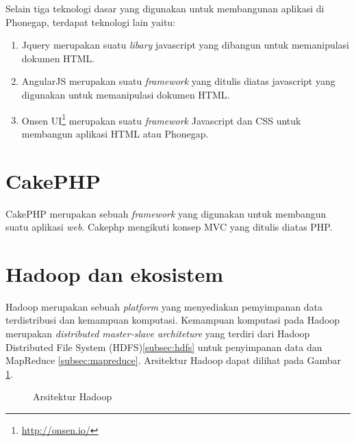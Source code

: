 Selain tiga teknologi dasar yang digunakan untuk membangunan aplikasi di Phonegap, terdapat teknologi lain yaitu:
\begin{enumerate}
	\item Jquery merupakan suatu \textit{libary} javascript yang dibangun untuk memanipulasi dokumen HTML.
	\item AngularJS merupakan suatu \textit{framework} yang ditulis diatas javascript yang digunakan untuk memanipulasi dokumen HTML.
	\item Onsen UI\footnote{\url{http://onsen.io/}} merupakan suatu \textit{framework} Javascript  dan CSS untuk membangun aplikasi HTML atau Phonegap.
\end{enumerate}

\section{CakePHP}

CakePHP merupakan sebuah \textit{framework} yang digunakan untuk membangun suatu aplikasi \textit{web}. Cakephp mengikuti konsep MVC yang ditulis diatas PHP.

\section{Hadoop dan ekosistem}
\label{sec:hadoopdanekosistem}

Hadoop merupakan sebuah \textit{platform} yang menyediakan pemyimpanan data terdistribusi dan kemampuan komputasi. Kemampuan komputasi pada Hadoop merupakan \textit{distributed master-slave architeture} yang terdiri dari Hadoop Distributed File System (HDFS)\ref{subsec:hdfs} untuk penyimpanan data dan MapReduce \ref{subsec:mapreduce}. Arsitektur Hadoop dapat dilihat pada Gambar \ref{fig:arsitektur_hadoop}\cite{holmes2012hadoop}.

\begin{figure}
\centering
{}
\caption[Arsitektur Hadoop]{Arsitektur Hadoop} 
\label{fig:arsitektur_hadoop}
\end{figure}

